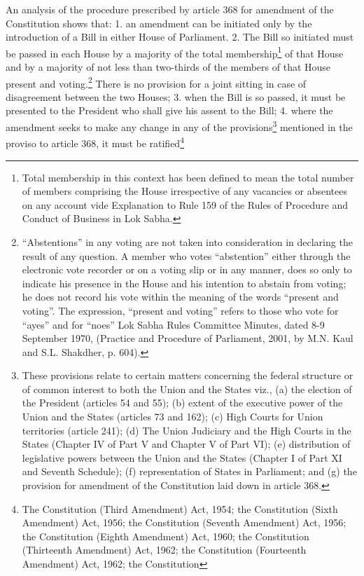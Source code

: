 \begin{multicols}{2}
\noi
An analysis of the procedure prescribed by article 368 for amendment of the Constitution
shows that: 1. an amendment can be initiated only by the introduction of a Bill in either House
of Parliament. 2. The Bill so initiated must be passed in each House by a majority of the total
membership\footnote{Total membership in this context has been defined to mean the total number of members comprising the House irrespective of any vacancies or absentees on any account vide Explanation to Rule 159 of the Rules of Procedure
and Conduct of Business in Lok Sabha.} of that House and by a majority of not less than two-thirds of the members of
that House present and voting.\footnote{“Abstentions” in any voting are not taken into consideration in declaring the result of any question. A member who votes “abstention” either through the electronic vote recorder or on a voting slip or in any manner, does so only to indicate his presence in the House and his intention to abstain from voting; he does not record his vote
within the meaning of the words “present and voting”. The expression, “present and voting” refers to those who
vote for “ayes” and for “noes” Lok Sabha Rules Committee Minutes, dated 8-9 September 1970, (Practice and
Procedure of Parliament, 2001, by M.N. Kaul and S.L. Shakdher, p. 604).} There is no provision for a joint sitting in case of
disagreement between the two Houses; 3. when the Bill is so passed, it must be presented to
the President who shall give his assent to the Bill; 4. where the amendment seeks to make any
change in any of the provisions\footnote{These provisions relate to certain matters concerning the federal structure or of common interest to both the Union and the States viz., (a) the election of the President (articles 54 and 55); (b) extent of the executive power of the Union and the States (articles 73 and 162); (c) High Courts for Union territories (article 241); (d) The Union
Judiciary and the High Courts in the States (Chapter IV of Part V and Chapter V of Part VI); (e) distribution of
legislative powers between the Union and the States (Chapter I of Part XI and Seventh Schedule); (f)
representation of States in Parliament; and (g) the provision for amendment of the Constitution laid down in article
368.} mentioned in the proviso to article 368, it must be ratified\footnote{The Constitution (Third Amendment) Act, 1954; the Constitution (Sixth Amendment) Act, 1956; the
Constitution (Seventh Amendment) Act, 1956; the Constitution (Eighth Amendment) Act, 1960; the Constitution
(Thirteenth Amendment) Act, 1962; the Constitution (Fourteenth Amendment) Act, 1962; the Constitution
}
\end{multicols}
